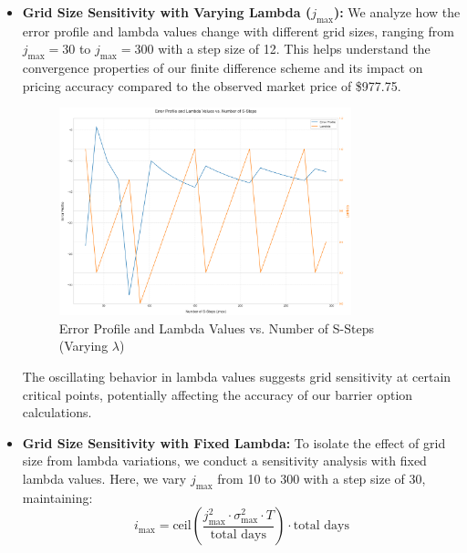 \documentclass[12pt,a4paper]{article}
\begin{document}
\begin{itemize}
\item \textbf{Grid Size Sensitivity with Varying Lambda (\(j_{\text{max}}\)):} We analyze how the error profile and lambda values change with different grid sizes, ranging from \(j_{\text{max}}=30\) to \(j_{\text{max}}=300\) with a step size of 12. This helps understand the convergence properties of our finite difference scheme and its impact on pricing accuracy compared to the observed market price of \$977.75.

\begin{figure}[H]
    \centering
    \includegraphics[width=0.8\textwidth, keepaspectratio]{images_project_3/lambda_vary.png}
    \caption{Error Profile and Lambda Values vs. Number of S-Steps (Varying \(\lambda\))}
    \label{fig:error_varying_lambda}
\end{figure}

The oscillating behavior in lambda values suggests grid sensitivity at certain critical points, potentially affecting the accuracy of our barrier option calculations.

\item \textbf{Grid Size Sensitivity with Fixed Lambda:} To isolate the effect of grid size from lambda variations, we conduct a sensitivity analysis with fixed lambda values. Here, we vary \(j_{\text{max}}\) from 10 to 300 with a step size of 30, maintaining:
\[
    i_{\text{max}} = \text{ceil}\left(\frac{j_{\text{max}}^2 \cdot \sigma_{\text{max}}^2 \cdot T}{\text{total days}}\right) \cdot \text{total days}
\]


\end{itemize}
\end{document}
